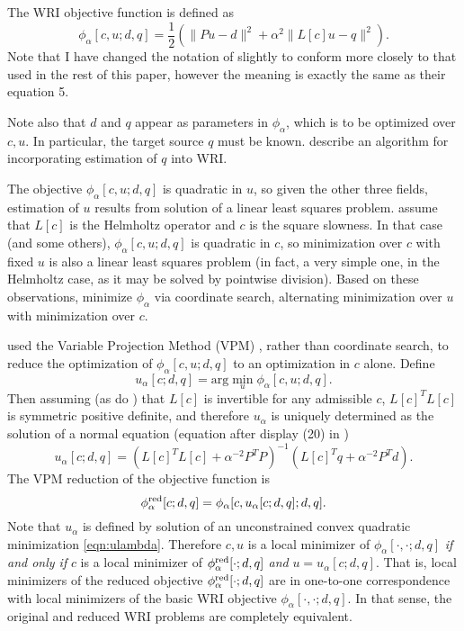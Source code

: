 The WRI objective function is defined as
\begin{equation}
  \label{eqn:wriorig}
  \phi_{\alpha}[c,u;d,q] = \frac{1}{2}(\|Pu-d\|^2 +
  \alpha^2\|L[c]u-q\|^2).
\end{equation}
Note that I have changed the notation of \cite{LeeuwenHerrmannWRI:13}
slightly to conform more closely to that used in the rest of this
paper, however the meaning is exactly the same as their equation 5.

Note also that $d$ and $q$ appear as parameters in $\phi_{\alpha}$, which
is to be optimized over $c,u$. In particular, the target source $q$
must be known. \cite{FangWangHerrmann:20} describe an algorithm for
incorporating estimation of $q$ into WRI.

The objective $\phi_{\alpha}[c,u;d,q]$ is quadratic in $u$, so given
the other three fields, estimation of $u$ results from solution of a
linear least squares problem. \cite{LeeuwenHerrmannWRI:13} assume that
$L[c]$ is the Helmholtz operator and $c$ is the square slowness. In
that case (and some others), $\phi_{\alpha}[c,u;d,q]$ is quadratic in
$c$, so minimization over $c$ with fixed $u$ is also a linear least
squares problem (in fact, a very simple one, in the Helmholtz case, as
it may be solved by pointwise division). Based on these observations,
\cite{LeeuwenHerrmannWRI:13} minimize $\phi_{\alpha}$ via
coordinate search, alternating minimization over $u$ with minimization
over $c$.

\cite{LeeuwenHerrmann:16} used the Variable Projection Method (VPM)
\cite[]{GolubPereyra:03}, rather than coordinate search, to reduce the
optimization of $\phi_{\alpha}[c,u;d,q]$ to an optimization in $c$
alone. Define
\begin{equation}
  \label{eqn:ulambda}
  u_{\alpha}[c;d,q]= \mbox{arg}\min_u \phi_{\alpha}[c,u;d,q].
\end{equation}
Then assuming (as do \cite{LeeuwenHerrmann:16}) that $L[c]$ is
invertible for any admissible $c$, $L[c]^TL[c]$ is symmetric positive
definite, and therefore $u_{\alpha}$ is uniquely determined as the
solution of a normal equation (equation after display (20) in
\cite[]{LeeuwenHerrmann:16})
\begin{equation}
  \label{eqn:unorm}
  u_{\alpha}[c;d,q] = (L[c]^TL[c] + \alpha^{-2} P^TP)^{-1}(L[c]^Tq  +
  \alpha^{-2}P^Td).
\end{equation}
The VPM reduction of the objective function is
\begin{equation}
  \label{eqn:uvpm}
  \phi_{\alpha}^{\rm
    red}[c;d,q]=\phi_{\alpha}[c,u_{\alpha}[c;d,q];d,q].
\end{equation}
Note that $u_{\alpha}$ is defined by solution of an unconstrained
convex quadratic minimization \ref{eqn:ulambda}. Therefore $c,u$ is a
local minimizer of $\phi_{\alpha}[\cdot,\cdot;d,q]$ {\em if and only
  if} $c$ is a local minimizer of $\phi_{\alpha}^{\rm red}[\cdot;d,q]$
{\em and} $u = u_{\alpha}[c;d,q]$. That is, local minimizers of the
reduced objective $\phi_{\alpha}^{\rm red}[\cdot;d,q]$ are in
one-to-one correspondence with local minimizers of the basic WRI
objective $\phi_{\alpha}[\cdot,\cdot;d,q]$. In that sense, the
original and reduced WRI problems are completely equivalent.

